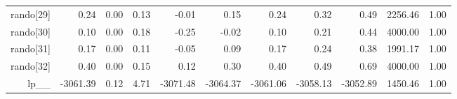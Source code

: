 \begin{table}[ht]
\begin{tabular}{rrrrrrrrrrr}
  rando[29] & 0.24 & 0.00 & 0.13 & -0.01 & 0.15 & 0.24 & 0.32 & 0.49 & 2256.46 & 1.00 \\ 
  rando[30] & 0.10 & 0.00 & 0.18 & -0.25 & -0.02 & 0.10 & 0.21 & 0.44 & 4000.00 & 1.00 \\ 
  rando[31] & 0.17 & 0.00 & 0.11 & -0.05 & 0.09 & 0.17 & 0.24 & 0.38 & 1991.17 & 1.00 \\ 
  rando[32] & 0.40 & 0.00 & 0.15 & 0.12 & 0.30 & 0.40 & 0.49 & 0.69 & 4000.00 & 1.00 \\ 
  lp\_\_ & -3061.39 & 0.12 & 4.71 & -3071.48 & -3064.37 & -3061.06 & -3058.13 & -3052.89 & 1450.46 & 1.00 \\ 
   \hline
\end{tabular}
\label{efit_tab}
\end{table}
